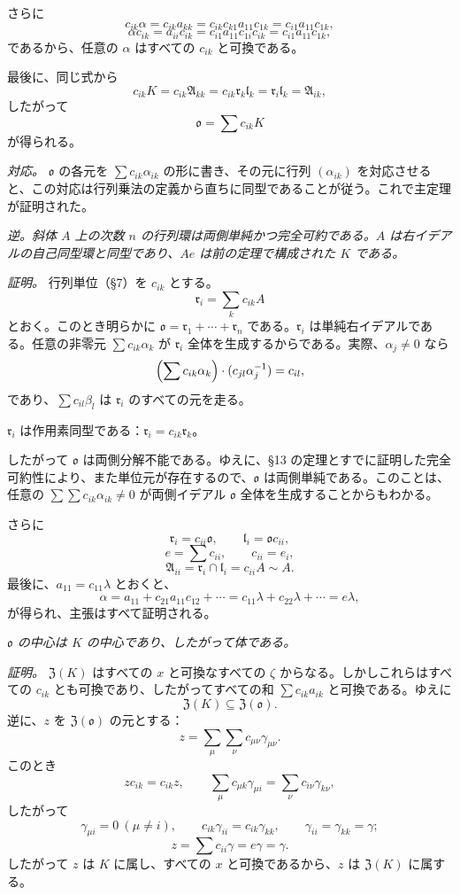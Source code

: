 \documentclass[11pt]{article}
\providecommand{\mA}{\mathfrak{A}}
\providecommand{\mo}{\mathfrak{o}}
\providecommand{\ml}{\mathfrak{l}}
\providecommand{\mr}{\mathfrak{r}}
\providecommand{\mZ}{\mathfrak{Z}}
\begin{document}
さらに
\[
        c_{ik}\alpha=c_{ik}a_{kk}=c_{ik}c_{k1}a_{11}c_{1k}=c_{i1}a_{11}c_{1k},
\]
\[
        \alpha c_{ik}=a_{ii}c_{ik}=c_{i1}a_{11}c_{1i}c_{ik}=c_{i1}a_{11}c_{1k},
\]
であるから、任意の $\alpha$ はすべての $c_{ik}$ と可換である。

最後に、同じ式から
\[
        c_{ik}K=c_{ik}\mA_{kk}=c_{ik}\mr_k\ml_k=\mr_i\ml_k=\mA_{ik},
\]
したがって
\[
        \mo=\sum c_{ik}K
\]
が得られる。

\emph{対応。} $\mo$ の各元を $\sum c_{ik}\alpha_{ik}$ の形に書き、その元に行列 $(\alpha_{ik})$ を対応させると、この対応は行列乗法の定義から直ちに同型であることが従う。これで主定理が証明された。

\emph{逆。斜体 $A$ 上の次数 $n$ の行列環は両側単純かつ完全可約である。$A$ は右イデアルの自己同型環と同型であり、$Ae$ は前の定理で構成された $K$ である。}

\emph{証明。} 行列単位（§7）を $c_{ik}$ とする。
\[
        \mr_i=\sum_k c_{ik}A
\]
とおく。このとき明らかに $\mo=\mr_1+\cdots+\mr_n$ である。$\mr_i$ は単純右イデアルである。任意の非零元 $\sum c_{ik}\alpha_k$ が $\mr_i$ 全体を生成するからである。実際、$\alpha_j\ne0$ なら
\[
        \Bigl(\sum c_{ik}\alpha_k\Bigr)\cdot(c_{jl}\alpha_j^{-1})=c_{il},
\]
であり、$\sum c_{il}\beta_l$ は $\mr_i$ のすべての元を走る。

$\mr_i$ は作用素同型である：$\mr_i=c_{ik}\mr_k$。

したがって $\mo$ は両側分解不能である。ゆえに、§13 の定理とすでに証明した完全可約性により、また単位元が存在するので、$\mo$ は両側単純である。このことは、任意の $\sum\sum c_{ik}\alpha_{ik}\ne0$ が両側イデアル $\mo$ 全体を生成することからもわかる。

さらに
\[
        \mr_i=c_{ii}\mo,
        \qquad
        \ml_i=\mo c_{ii},
\]
\[
        e=\sum c_{ii},
        \qquad c_{ii}=e_i,
\]
\[
        \mA_{ii}=\mr_i\cap\ml_i=c_{ii}A\sim A.
\]
最後に、$a_{11}=c_{11}\lambda$ とおくと、
\[
        \alpha=a_{11}+c_{21}a_{11}c_{12}+\cdots
        =c_{11}\lambda+c_{22}\lambda+\cdots=e\lambda,
\]
が得られ、主張はすべて証明される。

\emph{$\mo$ の中心は $K$ の中心であり、したがって体である。}

\emph{証明。} $\mZ(K)$ はすべての $x$ と可換なすべての $\zeta$ からなる。しかしこれらはすべての $c_{ik}$ とも可換であり、したがってすべての和 $\sum c_{ik}a_{ik}$ と可換である。ゆえに
\[
        \mZ(K)\subseteq\mZ(\mo).
\]
逆に、$z$ を $\mZ(\mo)$ の元とする：
\[
        z=\sum_\mu\sum_\nu c_{\mu\nu}\gamma_{\mu\nu}.
\]
このとき
\[
        zc_{ik}=c_{ik}z,
        \qquad
        \sum_\mu c_{\mu k}\gamma_{\mu i}=\sum_\nu c_{i\nu}\gamma_{k\nu},
\]
したがって
\[
        \gamma_{\mu i}=0\ (\mu\ne i),
        \qquad
        c_{ik}\gamma_{ii}=c_{ik}\gamma_{kk},
        \qquad
        \gamma_{ii}=\gamma_{kk}=\gamma;
\]
\[
        z=\sum c_{ii}\gamma=e\gamma=\gamma.
\]
したがって $z$ は $K$ に属し、すべての $x$ と可換であるから、$z$ は $\mZ(K)$ に属する。
\end{document}
